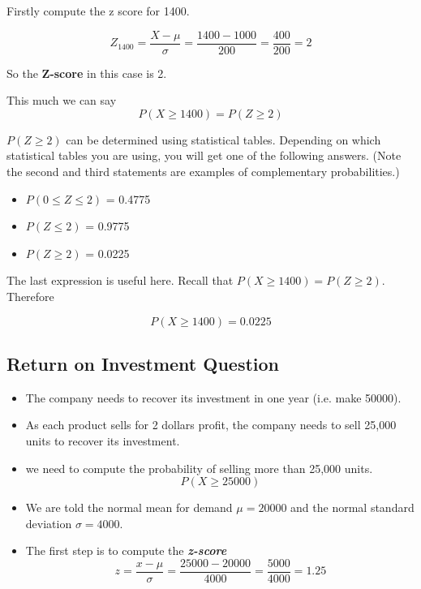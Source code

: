 \documentclass[a4paper,12pt]{article}
\begin{document}
Firstly compute the z score for 1400.

\[ Z_{1400} =  \frac{X - \mu}{\sigma} = \frac{1400 - 1000}{200} = \frac{400}{200} = 2  \]

So the \textbf{Z-score} in this case is 2.

This much we can say
\[P(X \geq 1400) = P(Z \geq 2)\]

$P(Z \geq 2)$ can be determined using statistical tables.
Depending on which statistical tables you are using, you will get one of the following answers. (Note the 
second and third statements are examples of complementary probabilities.)
\begin{itemize}
\item $P (0 \leq Z \leq 2)$ = 0.4775
\item $P ( Z \leq 2)$ = 0.9775
\item $P ( Z \geq 2)$ = 0.0225
\end{itemize}
The last expression is useful here. Recall that $P(X \geq 1400) = P(Z \geq 2)$. Therefore

\[P(X \geq 1400) = 0.0225\]

\subsection*{Return on Investment Question}

\begin{itemize}
\item The company needs to recover its investment in one year (i.e. make 50000).
\item As each product sells for 2 dollars profit, the company needs to sell 25,000 units to recover its investment.
\item we need to compute the probability of selling more than 25,000 units.
\[P(X \geq 25000) \]
\item We are told the normal mean for demand $\mu =20000$ and the normal standard deviation $\sigma = 4000$.
\item The first step is to compute the \textbf{\textit{z-score}}
\[ z = \frac{x - \mu}{\sigma}  = \frac{25000 - 20000}{4000} = \frac{5000}{4000} = 1.25\]
\end{itemize}

\newpage
\end{document}
